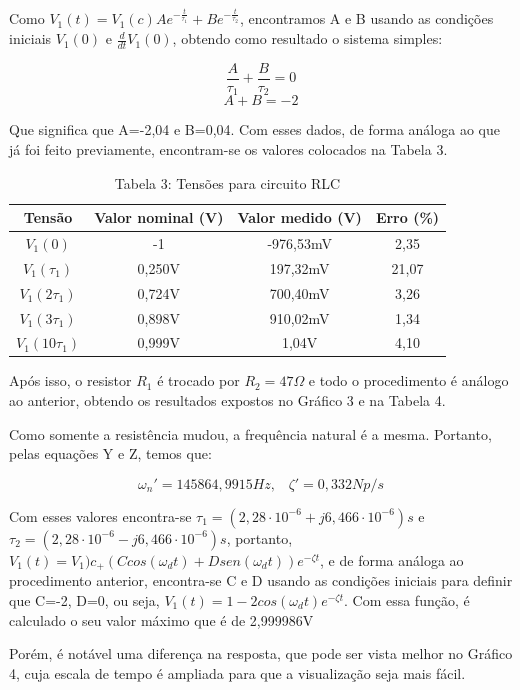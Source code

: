 \documentclass[a4 paper]{article}
\begin{document}
Como $V_1(t)=V_1(c)Ae^{-\frac{t}{\tau_1}}+Be^{-\frac{t}{\tau_2}}$, encontramos A e B usando as condições iniciais $V_1(0)$ e $\frac{d}{dt}V_1(0)$, obtendo como resultado o sistema simples:

\[\frac{A}{\tau_1}+\frac{B}{\tau_2}=0\]
\[A+B=-2\]

Que significa que A=-2,04 e B=0,04. Com esses dados, de forma análoga ao que já foi feito previamente, encontram-se os valores colocados na Tabela 3.

\vspace{5pt}
\begin{table}[h]
\centering
\begin{tabular}{|c|c|c|c|}
\hline
Tensão & Valor nominal (V) & Valor medido (V) & Erro (\%) \\\hline
$V_1(0)$ & -1 & -976,53mV & 2,35\\    \hline
$V_1(\tau_1)$ & 0,250V & 197,32mV &21,07 \\    \hline
$V_1(2\tau_1)$ & 0,724V & 700,40mV &3,26\\\hline
$V_1(3\tau_1)$ & 0,898V & 910,02mV &1,34 \\\hline
$V_1(10\tau_1)$ & 0,999V & 1,04V &4,10 \\\hline
\end{tabular}
\caption*{Tabela 3: Tensões para circuito RLC}
\end{table}


Após isso, o resistor $R_1$ é trocado por $R_2=47\Omega$ e todo o procedimento é análogo ao anterior, obtendo os resultados expostos no Gráfico 3 e na Tabela 4.

Como somente a resistência mudou, a frequência natural é a mesma. Portanto, pelas equações Y e Z, temos que:

\[\omega_n'=145864,9915 Hz,\hspace{10pt}\zeta'=0,332Np/s\]

Com esses valores encontra-se $\tau_1=(2,28\cdot10^{-6}+j6,466\cdot10^{-6}) s$ e $\tau_2=(2,28\cdot10^{-6}-j6,466\cdot10^{-6}) s$, portanto, $V_1(t)=V_1)c_+(Ccos(\omega_dt)+Dsen(\omega_dt))e^{-\zeta t}$, e de forma análoga ao procedimento anterior, encontra-se C e D usando as condições iniciais para definir que C=-2, D=0, ou seja, $V_1(t)=1-2cos(\omega_dt)e^{-\zeta t}$. Com essa função, é calculado o seu valor máximo que é de 2,999986V

Porém, é notável uma diferença na resposta, que pode ser vista melhor no Gráfico 4, cuja escala de tempo é ampliada para que a visualização seja mais fácil.
\end{document}
